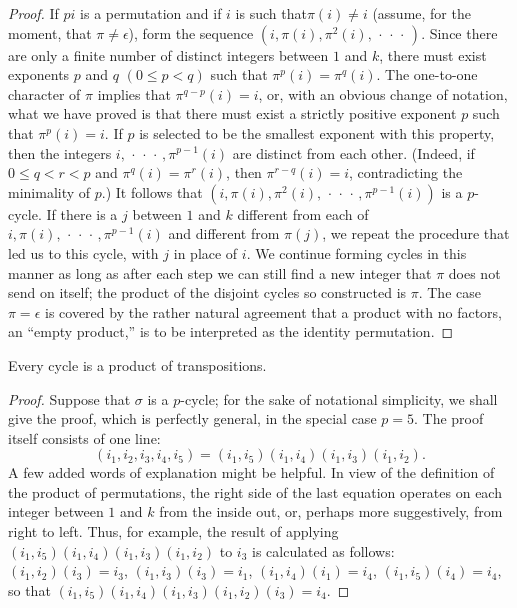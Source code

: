 \begin{proof}
    If \(pi\) is a permutation and if \(i\) is such that\(\pi(i) \neq i\)
    (assume, for the moment, that \(\pi \neq \epsilon\)), form the sequence
    \((i, \pi(i), \pi^2(i), \,\cdot\,\cdot\,\cdot\,)\). Since there are only a finite number of
    distinct integers between \(1\) and \(k\), there must exist exponents \(p\)
    and \(q\) \((0 \leq p < q)\) such that \(\pi^p(i) = \pi^q(i)\). The
    one-to-one character of \(\pi\) implies that \(\pi^{q-p} (i) = i\), or, with
    an obvious change of notation, what we have proved is that there must exist
    a strictly positive exponent \(p\) such that \(\pi^p(i) = i\). If \(p\) is
    selected to be the smallest exponent with this property, then the integers
    \(i, \,\cdot\,\cdot\,\cdot\,, \pi^{p-1}(i)\) are distinct from each other. (Indeed, if \(0
    \leq q < r <p\) and \(\pi^q(i) = \pi^r(i)\), then \(\pi^{r-q}(i) = i\),
    contradicting the minimality of \(p\).) It follows that \((i, \pi(i),
    \pi^2(i), \,\cdot\,\cdot\,\cdot\,, \pi^{p-1}(i))\) is a \(p\)-cycle. If there is a \(j\)
    between \(1\) and \(k\) different from each of \(i, \pi(i), \,\cdot\,\cdot\,\cdot\,,
    \pi^{p-1}(i)\) and different from \(\pi(j)\), we repeat the procedure that
    led us to this cycle, with \(j\) in place of \(i\). We continue forming
    cycles in this manner as long as after each step we can still find a new
    integer that \(\pi\) does not send on itself; the product of the disjoint
    cycles so constructed is \(\pi\). The case \(\pi = \epsilon\) is covered by
    the rather natural agreement that a product with no factors, an ``empty
    product,'' is to be interpreted as the identity permutation.
\end{proof}

\begin{theorem}
    Every cycle is a product of transpositions.
\end{theorem}

\begin{proof}
    Suppose that \(\sigma\) is a \(p\)-cycle; for the sake of notational simplicity, we shall give the proof, which is perfectly general, in the special case \(p = 5\). The proof itself consists of one line:
    \begin{equation*}
        (i_1, i_2, i_3, i_4, i_5) = (i_1, i_5) (i_1, i_4) (i_1, i_3) (i_1, i_2).
    \end{equation*}
    A few added words of explanation might be helpful. In view of the definition of the product of permutations, the right side of the last equation operates on each integer between \(1\) and \(k\) from the inside out, or, perhaps more suggestively, from right to left. Thus, for example, the result of applying \((i_1, i_5) (i_1, i_4) (i_1, i_3) (i_1, i_2)\) to \(i_3\) is calculated as follows: \((i_1, i_2) (i_3) = i_3\), \((i_1, i_3) (i_3) = i_1\), \((i_1, i_4)(i_1) = i_4\), \((i_1, i_5)(i_4) = i_4\), so that \((i_1, i_5) (i_1, i_4) (i_1, i_3) (i_1, i_2) (i_3) = i_4\).
\end{proof}

